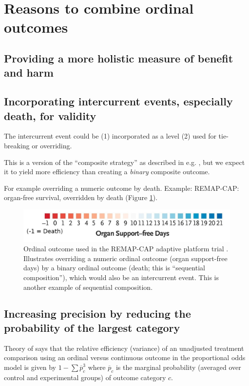 \documentclass[
  11pt,
  fleqn
]{article}
\begin{document}
\section{Reasons to combine ordinal outcomes}

\subsection{Providing a more holistic measure of benefit and harm}

\subsection{Incorporating intercurrent events, especially death,
for validity}

The intercurrent event could be (1) incorporated as a level (2) used
for tie-breaking or overriding.

This is a version of the ``composite strategy'' as described in e.g.
\citet{kahanEstimandsFrameworkPrimer2024}, but we expect it to yield
more efficiency than creating a \emph{binary} composite outcome.

For example overriding a numeric outcome by death.
Example: REMAP-CAP: organ-free survival, overridden by death
(Figure \ref{fig:remap_cap_override}).

\begin{figure}
  \includegraphics[width=5in]{remap_outcome_extra_cropped.jpg}
  \caption{Ordinal outcome used in the REMAP-CAP adaptive
    platform trial
    \citep{theremap-capinvestigatorsInterleukin6ReceptorAntagonists2021}.
    Illustrates overriding a numeric ordinal outcome (organ
    support-free days) by a binary ordinal outcome (death; this is
    ``sequential composition''), which
    would also be an intercurrent event. This is another example of
  sequential composition.}
  \label{fig:remap_cap_override}
\end{figure}

\subsection{Increasing precision by reducing the probability of the
largest category}

Theory of \citep{whiteheadSampleSizeCalculations1993} says that the relative
efficiency (variance) of an unadjusted treatment comparison using an ordinal
versus continuous outcome in the proportional odds model is given by $1 - \sum
\overline p_c^3$ where $\overline p_c$ is the marginal probability (averaged
over control and experimental groups) of outcome category $c$.
\end{document}
